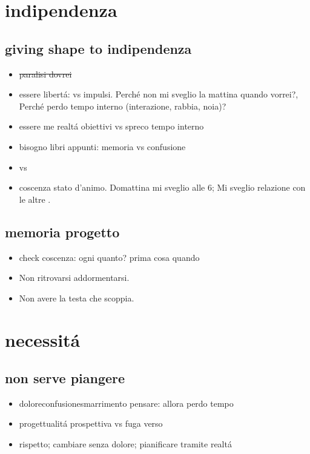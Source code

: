 \section{indipendenza}

\subsection{giving shape to indipendenza}

\begin{itemize}
\item \sout{paralisi dovrei} 
\item essere libert\'a:  vs impulsi. Perch\'e non mi sveglio la mattina quando vorrei?, Perch\'e perdo tempo interno (interazione, rabbia, noia)?
\item essere me realt\'a obiettivi vs spreco tempo interno
\item bisogno libri appunti: memoria vs confusione
\item {} vs 
\item coscenza stato d'animo. Domattina mi sveglio alle 6; Mi sveglio  relazione con le altre .
\end{itemize}

\subsection{memoria progetto}

\begin{itemize}
\item check coscenza: ogni quanto? prima cosa quando 
\item Non ritrovarsi addormentarsi.
\item Non avere la testa che scoppia.
\end{itemize}

\section{necessit\'a}

\subsection{non serve piangere}

\begin{itemize}
\item doloreconfusionesmarrimento pensare: allora perdo tempo
\item progettualit\'a prospettiva vs fuga verso
\item rispetto;  cambiare senza dolore; pianificare tramite realt\'a
\end{itemize}

